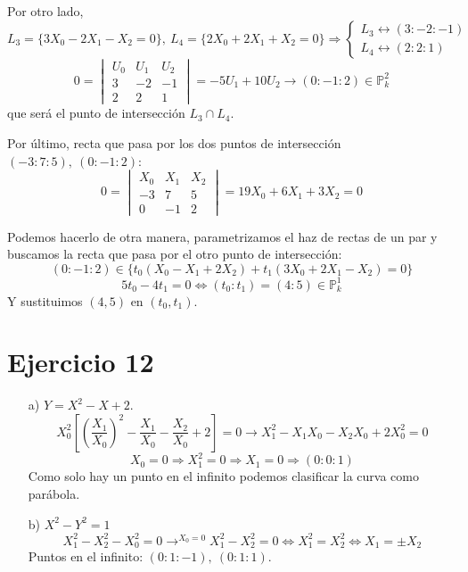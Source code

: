 \documentclass[10pt,a4paper,openright]{book}
\theoremstyle{break}
\begin{document}
Por otro lado,
\[
L_3 = \{3X_0 - 2X_1 - X_2 = 0\},\ L_4 = \{2X_0 + 2X_1 + X_2 = 0\} \Rightarrow \begin{cases}
    L_3 \leftrightarrow \left( 3 : -2 : -1 \right)\\
    L_4 \leftrightarrow \left( 2 : 2 : 1 \right) 
\end{cases} 
\]\[
0 = \begin{vmatrix} U_0 & U_1 & U_2\\ 3 & -2 & -1\\ 2 & 2 & 1 \end{vmatrix} = -5U_1 + 10U_2 \rightarrow \left( 0 : -1 : 2 \right) \in \mathbb{P}^{2}_{k} 
\]
que será el punto de intersección $L_3 \cap L_4$.

Por último, recta que pasa por los dos puntos de intersección $\left( -3 : 7 : 5 \right),\ \left( 0 : -1 : 2 \right)$:
\[
    0 = \begin{vmatrix} X_0 & X_1 & X_2\\ -3 & 7 & 5\\ 0 & -1 & 2 \end{vmatrix} = \boxed{19X_0 + 6X_1 + 3X_2 =  0} 
\]

Podemos hacerlo de otra manera, parametrizamos el haz de rectas de un par y buscamos la recta que pasa por el otro punto de intersección:
\[
\left( 0 : -1 : 2 \right) \in \{t_0 \left( X_0 - X_1 + 2X_2 \right) + t_1\left( 3X_0 + 2X_1 - X_2 \right) = 0\} 
\]\[
5t_0 - 4t_1 = 0 \Leftrightarrow \left( t_0 : t_1 \right) = \left( 4 : 5 \right) \in \mathbb{P}^{1}_{k} 
\]
Y sustituimos $\left( 4, 5 \right)$ en $\left( t_0, t_1 \right)$.

\section{Ejercicio 12}%
\label{sec:ejercicio_12}
\begin{enumerate}
    \item[a)] $Y = X^2 - X + 2$.
    \[
    X_0^2\left[ \left( \frac{X_1}{X_0} \right)^2 - \frac{X_1}{X_0} - \frac{X_2}{X_0} + 2 \right] = 0 \rightarrow X_1^2 - X_1X_0 - X_2X_0 + 2X_0^2 = 0
    \]\[
    X_0 = 0 \Rightarrow X_1^2 = 0 \Rightarrow X_1 = 0 \Rightarrow \left( 0 : 0 : 1 \right) 
    \]
    Como solo hay un punto en el infinito podemos clasificar la curva como parábola.

    \item[b)] $X^2 - Y^2 = 1$
    \[
    X_1^2 - X_2^2 - X_0^2 = 0 \rightarrow^{X_0 = 0} X_1^2 - X_2^2 = 0 \Leftrightarrow X_1^2 = X_2^2 \Leftrightarrow X_1 = \pm X_2 
    \]
    Puntos en el infinito: $\left( 0 : 1 : -1 \right),\ \left( 0 : 1 : 1 \right)$.
\end{enumerate}
\end{document}
